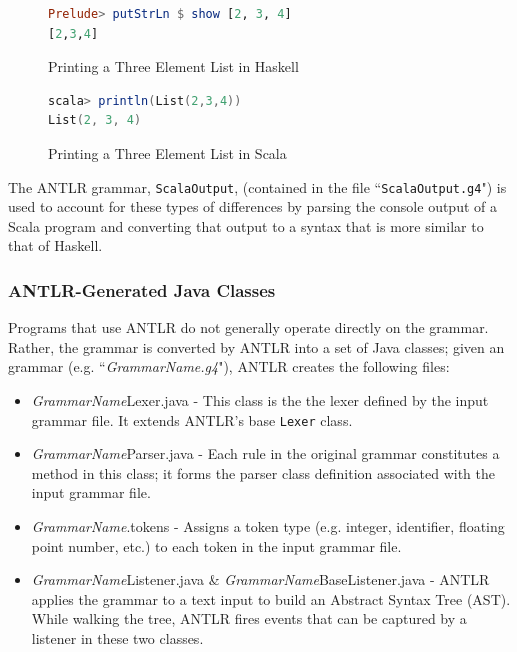 \documentclass{report}
\begin{document}
\begin{figure}[H]
\begin{mdframed}
\begin{lstlisting}[language=Haskell]
Prelude> putStrLn $ show [2, 3, 4]
[2,3,4]
\end{lstlisting}
\end{mdframed}
\caption{Printing a Three Element List in Haskell}\label{fig:printListHaskell}
\end{figure}

\begin{figure}[H]
\begin{mdframed}
\begin{lstlisting}[language=Scala]
scala> println(List(2,3,4))
List(2, 3, 4)
\end{lstlisting}
\end{mdframed}
\caption{Printing a Three Element List in Scala}\label{fig:printListScala}
\end{figure}

The ANTLR grammar, \texttt{ScalaOutput}, (contained in the file ``\texttt{ScalaOutput.g4}") is used to account for these types of differences by parsing the console output of a Scala program and converting that output to a syntax that is more similar to that of Haskell.

\subsubsection{ANTLR-Generated Java Classes}

Programs that use ANTLR do not generally operate directly on the grammar.  Rather, the grammar is converted by ANTLR into a set of Java classes; given an  grammar (e.g. ``\emph{GrammarName.g4}"),  ANTLR creates the following files:

\begin{itemize}
	\item \emph{GrammarName}Lexer.java - This class is the the lexer defined by the input grammar file.  It extends ANTLR's base \texttt{Lexer} class.
	
	\item \emph{GrammarName}Parser.java - Each rule in the original grammar constitutes a method in this class; it forms the parser class definition associated with the input grammar file.
	
	\item \emph{GrammarName}.tokens - Assigns a token type (e.g. integer, identifier, floating point number, etc.) to each token in the input grammar file.
	
	\item \emph{GrammarName}Listener.java \& \emph{GrammarName}BaseListener.java - ANTLR applies the grammar to a text input to build an Abstract Syntax Tree (AST).  While walking the tree, ANTLR fires events that can be captured by a listener in these two classes\cite{antlrDefinitiveReference}.
	
\end{itemize}
\end{document}
